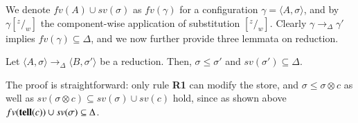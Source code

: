 \documentclass[main.tex]{subfiles}
\begin{document}
We denote $fv(A) \cup sv(\sigma)$ as $fv(\gamma)$ for a configuration
$\gamma = \langle A, \sigma \rangle$, and by
$\gamma[^z/_w]$ the component-wise application of substitution $[^z/_w]$.
%
 Clearly $\gamma \rightarrow_\Delta \gamma'$ 
 implies $fv(\gamma) \subseteq \Delta$, and 
 we now further provide three lemmata on reduction.

\begin{lemma}[Mono]\label{mono}
Let $\langle A, \sigma \rangle \rightarrow_\Delta \langle B, \sigma' \rangle$
be a reduction. Then, $\sigma \leq \sigma'$ and $sv(\sigma') \subseteq \Delta$.
\end{lemma}

The proof is straightforward: only rule {\bf R1} can modify the store,
and $\sigma \leq \sigma \otimes c$ as well as 
$sv(\sigma \otimes c) \subseteq sv(\sigma) \cup sv(c)$ hold,
since as shown above $fv( \hbox{{\bf tell}}(c) ) \cup sv(\sigma) \subseteq \Delta$.

%
%

\end{document}
